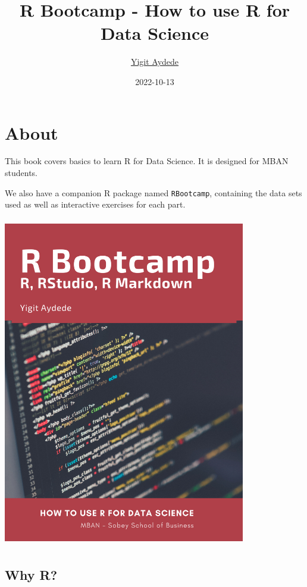 \documentclass[
]{book}
\title{R Bootcamp - How to use R for Data Science}
\author{\href{https://yaydede.github.io/}{Yigit Aydede}}
\date{2022-10-13}
\theoremstyle{definition}
\theoremstyle{definition}
\theoremstyle{definition}
\theoremstyle{definition}
\theoremstyle{remark}
\begin{document}
\maketitle

{
\hypersetup{linkcolor=}
\setcounter{tocdepth}{1}
\tableofcontents
}
\hypertarget{about}{%
\chapter*{About}\label{about}}

This book covers basics to learn R for Data Science. It is designed for MBAN students.

We also have a companion R package named \texttt{RBootcamp}, containing the data sets used as well as interactive exercises for each part.

\includegraphics[width=4.16667in,height=5.72917in]{png/cover2.png}

\hypertarget{why-r}{%
\section*{Why R?}\label{why-r}}
\end{document}
